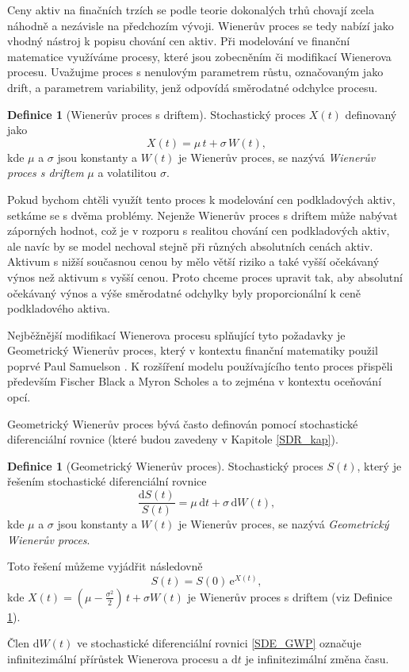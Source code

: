 \documentclass[a4paper,12pt]{report}
\theoremstyle{definition} \newtheorem{definice}[veta]{Definice}
\theoremstyle{remark}
\begin{document}
Ceny aktiv na finačních trzích se podle teorie dokonalých trhů chovají zcela náhodně a nezávisle na předchozím vývoji.
Wienerův proces se tedy nabízí jako vhodný nástroj k popisu chování cen aktiv.
Při modelování ve finanční matematice využíváme procesy, které jsou zobecněním či modifikací Wienerova procesu. 
Uvažujme proces s nenulovým parametrem růstu, označovaným jako drift, a parametrem variability, jenž odpovídá směrodatné odchylce procesu.
\begin{definice}[Wienerův proces s driftem]\label{Wieneruv_proces_s_driftem}
Stochastický proces $X(t)$ definovaný jako
$$X(t)  = \mu\, t + \sigma\, W (t),$$
kde $\mu$ a $\sigma$ jsou konstanty a $W (t)$ je Wienerův proces,
se nazývá \textit{Wienerův proces  s driftem} $\mu$ a volatilitou $\sigma$.
\end{definice}
Pokud bychom chtěli využít tento proces k modelování cen podkladových aktiv, setkáme se s dvěma problémy.
Nejenže Wienerův proces s driftem může nabývat záporných hodnot, což je v rozporu s realitou chování cen podkladových aktiv, ale navíc by se model nechoval stejně při různých absolutních cenách aktiv. 
Aktivum s nižší současnou cenou by mělo větší riziko a také vyšší očekávaný výnos než aktivum s vyšší cenou.
Proto chceme proces upravit tak, aby absolutní očekávaný výnos a výše směrodatné odchylky byly proporcionální k ceně podkladového aktiva. 

Nejběžnější modifikací Wienerova procesu splňující tyto požadavky je Geometrický Wienerův proces, který v kontextu finanční matematiky použil poprvé Paul Samuelson \cite{samuelson1964rational}.
K rozšíření modelu používajícího tento proces přispěli především Fischer Black a Myron Scholes \cite{black1973pricing} a to zejména v kontextu oceňování opcí.

Geometrický Wienerův proces bývá často definován pomocí  stochastické diferenciální rovnice (které budou zavedeny v Kapitole \ref{SDR_kap}).
\begin{definice}[Geometrický Wienerův proces]\label{Geometricky_Wieneruv_proces}
Stochastický proces $S(t)$, který je řešením stochastické diferenciální rovnice 
\begin{equation}\label{SDE_GWP}
\frac{\mathrm{d} S(t)}{S(t)} = \mu\,\mathrm{d}t + \sigma\,\mathrm{d}W (t), 
\end{equation}
kde  $\mu$ a $\sigma$ jsou konstanty a $W (t)$ je Wienerův proces,
se nazývá \textit{Geometrický Wienerův proces}.

Toto řešení můžeme vyjádřit následovně
\begin{equation}\label{GWP}
S(t) = S(0)\,\mathrm{e}^{X(t)},
\end{equation}
kde $X(t) = (\mu - \frac{\sigma^2}{2})\,t + \sigma W (t)$ je Wienerův proces s driftem (viz Definice \ref{Wieneruv_proces_s_driftem}).
\end{definice}
Člen $\mathrm{d}W(t)$ ve stochastické diferenciální rovnici \eqref{SDE_GWP} označuje infinitezimální přírůstek Wienerova procesu a $\mathrm{d}t$ je infinitezimální změna času.
\end{document}
